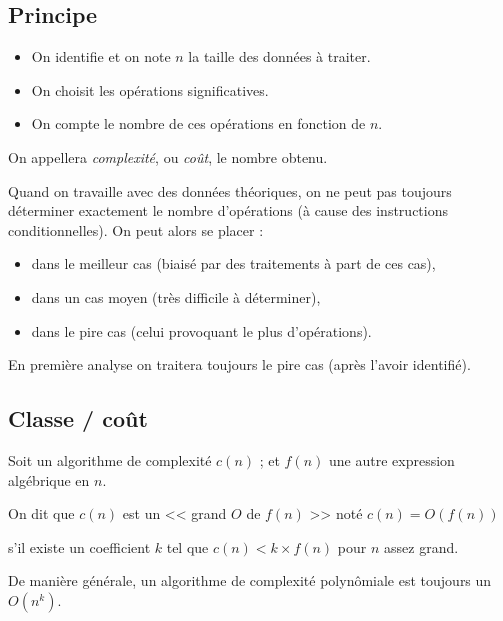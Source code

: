 \subsection{Principe}

\begin{itemize}
	\item On identifie et on note $n$ la taille des données à traiter.
	\item On choisit les opérations significatives.
	\item On compte le nombre de ces opérations en fonction de $n$.
\end{itemize}

On appellera \emph{complexité}, ou \emph{coût}, le nombre obtenu.

\medskip

Quand on travaille avec des données théoriques, on ne peut pas toujours déterminer exactement le nombre d'opérations (à cause des instructions conditionnelles). On peut alors se placer :

\begin{itemize}
	\item dans le meilleur cas (biaisé par des traitements à part de ces cas),
	\item dans un cas moyen (très difficile à déterminer),
	\item dans le pire cas (celui provoquant le plus d'opérations).
\end{itemize}

En première analyse on traitera toujours le pire cas (après l'avoir identifié). 

\subsection{Classe / coût}



Soit un algorithme de complexité $c(n)$ ; et $f(n)$ une autre expression algébrique en $n$.

\begin{center}On dit que $c(n)$ est un << grand $O$ de $f(n)$ >> noté $c(n)=O(f(n))$

s'il existe un coefficient $k$ tel que $c(n)<k\times f(n)$ pour $n$ assez grand.\end{center}

De manière générale, un algorithme de complexité polynômiale est toujours un $O(n^k)$.




